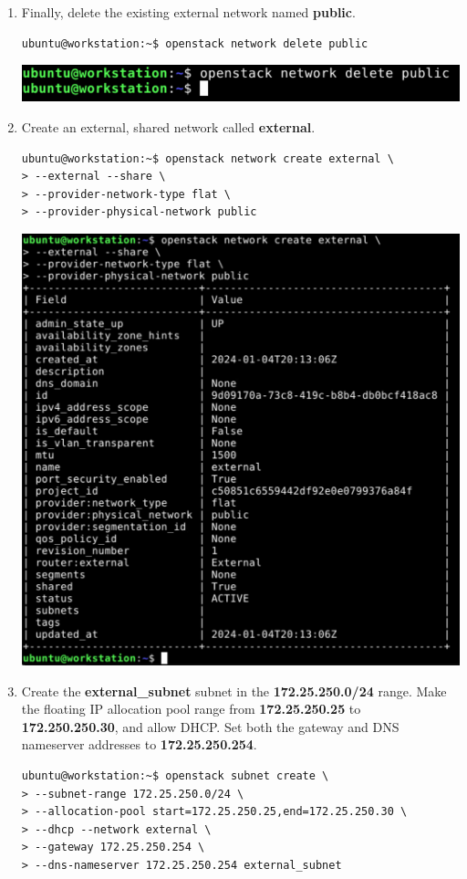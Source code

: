 \documentclass[letterpaper, 12pt]{article}
\begin{document}
\begin{enumerate}
    \item Finally, delete the existing external network named \textbf{public}.
\begin{lstlisting}
ubuntu@workstation:~$ openstack network delete public
\end{lstlisting}

    \begin{center}
        \includegraphics[width=\linewidth]{images/part1/step16.png}
    \end{center}

    \item Create an external, shared network called \textbf{external}.
\begin{lstlisting}
ubuntu@workstation:~$ openstack network create external \
> --external --share \
> --provider-network-type flat \
> --provider-physical-network public
\end{lstlisting}

    \begin{center}
        \includegraphics[width=\linewidth]{images/part1/step17.png}
    \end{center}

    \item Create the \textbf{external\_subnet} subnet in the \textbf{172.25.250.0/24} range. Make the floating IP
    allocation pool range from \textbf{172.25.250.25} to \textbf{172.250.250.30}, and allow DHCP. Set both the gateway
    and DNS nameserver addresses to \textbf{172.25.250.254}.
\begin{lstlisting}
ubuntu@workstation:~$ openstack subnet create \
> --subnet-range 172.25.250.0/24 \
> --allocation-pool start=172.25.250.25,end=172.25.250.30 \
> --dhcp --network external \
> --gateway 172.25.250.254 \
> --dns-nameserver 172.25.250.254 external_subnet
\end{lstlisting}


\end{enumerate}
\end{document}
